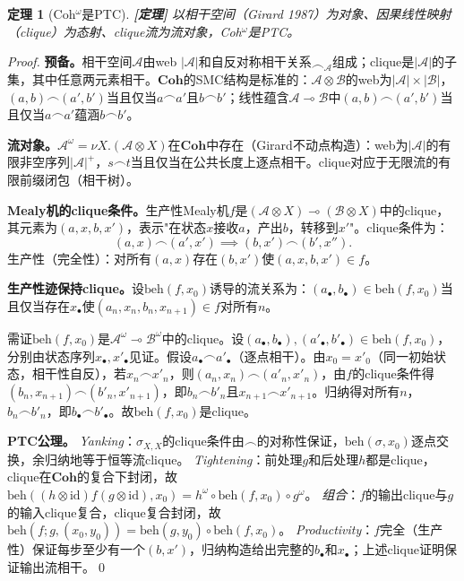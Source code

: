 \documentclass[11pt,a4paper]{article}
\newtheorem{theorem}{定理}
\newcommand{\lvl}[1]{\hfill\textbf{\footnotesize[#1]}}
\newcommand{\lvP}{\lvl{定理}}
\newcommand{\lolli}{\multimap}
\newcommand{\coh}{\mathrel{\frown}}
\begin{document}
\begin{theorem}[Coh$^\omega$是PTC]\label{thm:coh-ptc}\lvP
以相干空间（Girard 1987）为对象、因果线性映射（clique）为态射、clique流为流对象，Coh$^\omega$是PTC。
\end{theorem}

\begin{proof}
\textbf{预备。}相干空间$\mathcal{A}$由web $|\mathcal{A}|$和自反对称相干关系$\coh_{\mathcal{A}}$组成；clique是$|\mathcal{A}|$的子集，其中任意两元素相干。$\mathbf{Coh}$的SMC结构是标准的：$\mathcal{A}\otimes\mathcal{B}$的web为$|\mathcal{A}|\times|\mathcal{B}|$，$(a,b)\coh(a',b')$当且仅当$a\coh a'$且$b\coh b'$；线性蕴含$\mathcal{A}\lolli\mathcal{B}$中$(a,b)\coh(a',b')$当且仅当$a\coh a'$蕴涵$b\coh b'$。

\textbf{流对象。}$\mathcal{A}^\omega=\nu X.(\mathcal{A}\otimes X)$在$\mathbf{Coh}$中存在（Girard不动点构造）：web为$|\mathcal{A}|$的有限非空序列$|\mathcal{A}|^+$，$s\coh t$当且仅当在公共长度上逐点相干。clique对应于无限流的有限前缀闭包（相干树）。

\textbf{Mealy机的clique条件。}生产性Mealy机$f$是$(\mathcal{A}\otimes X)\lolli(\mathcal{B}\otimes X)$中的clique，其元素为$(a,x,b,x')$，表示"在状态$x$接收$a$，产出$b$，转移到$x'$"。clique条件为：
$$(a,x)\coh(a',x')\implies(b,x')\coh(b',x'').$$
生产性（完全性）：对所有$(a,x)$存在$(b,x')$使$(a,x,b,x')\in f$。

\textbf{生产性迹保持clique。}设$\mathrm{beh}(f,x_0)$诱导的流关系为：$(a_\bullet,b_\bullet)\in\mathrm{beh}(f,x_0)$当且仅当存在$x_\bullet$使$(a_n,x_n,b_n,x_{n+1})\in f$对所有$n$。

需证$\mathrm{beh}(f,x_0)$是$\mathcal{A}^\omega\lolli\mathcal{B}^\omega$中的clique。设$(a_\bullet,b_\bullet),(a'_\bullet,b'_\bullet)\in\mathrm{beh}(f,x_0)$，分别由状态序列$x_\bullet,x'_\bullet$见证。假设$a_\bullet\coh a'_\bullet$（逐点相干）。由$x_0=x'_0$（同一初始状态，相干性自反），若$x_n\coh x'_n$，则$(a_n,x_n)\coh(a'_n,x'_n)$，由$f$的clique条件得$(b_n,x_{n+1})\coh(b'_n,x'_{n+1})$，即$b_n\coh b'_n$且$x_{n+1}\coh x'_{n+1}$。归纳得对所有$n$，$b_n\coh b'_n$，即$b_\bullet\coh b'_\bullet$。故$\mathrm{beh}(f,x_0)$是clique。

\textbf{PTC公理。}
\emph{Yanking}：$\sigma_{X,X}$的clique条件由$\coh$的对称性保证，$\mathrm{beh}(\sigma,x_0)$逐点交换，余归纳地等于恒等流clique。
\emph{Tightening}：前处理$g$和后处理$h$都是clique，clique在$\mathbf{Coh}$的复合下封闭，故$\mathrm{beh}((h\otimes\mathrm{id})f(g\otimes\mathrm{id}),x_0)=h^\omega\circ\mathrm{beh}(f,x_0)\circ g^\omega$。
\emph{组合}：$f$的输出clique与$g$的输入clique复合，clique复合封闭，故$\mathrm{beh}(f;g,(x_0,y_0))=\mathrm{beh}(g,y_0)\circ\mathrm{beh}(f,x_0)$。
\emph{Productivity}：$f$完全（生产性）保证每步至少有一个$(b,x')$，归纳构造给出完整的$b_\bullet$和$x_\bullet$；上述clique证明保证输出流相干。\qed
\end{proof}
\end{document}
